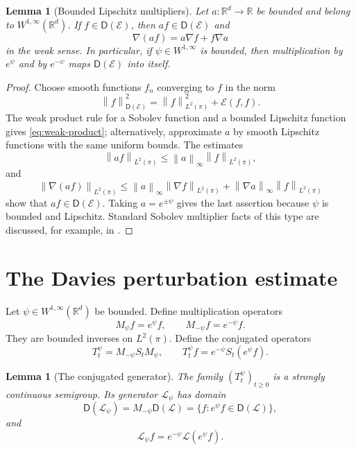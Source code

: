 \documentclass[11pt]{article}
\newtheorem{lemma}[theorem]{Lemma}
\newcommand{\R}{\mathbb R}
\newcommand{\cE}{\mathcal E}
\newcommand{\norm}[1]{\left\lVert #1\right\rVert}
\newcommand{\1}{\mathbf 1}
\newcommand{\D}{\mathsf D}
\begin{document}
\begin{lemma}[Bounded Lipschitz multipliers]\label{lem:multipliers}
Let \(a:\R^d\to\R\) be bounded and belong to \(W^{1,\infty}(\R^d)\).  If
\(f\in\D(\cE)\), then \(af\in\D(\cE)\) and
\begin{equation}\label{eq:weak-product}
 \nabla(af)=a\nabla f+f\nabla a
\end{equation}
in the weak sense.  In particular, if \(\psi\in W^{1,\infty}\) is bounded,
then multiplication by \(e^{\psi}\) and by \(e^{-\psi}\) maps
\(\D(\cE)\) into itself.
\end{lemma}

\begin{proof}
Choose smooth functions \(f_n\) converging to \(f\) in the norm
\[
 \norm f_{\D(\cE)}^2=\norm f_{L^2(\pi)}^2+\cE(f,f).
\]
The weak product rule for a Sobolev function and a bounded Lipschitz
function gives \eqref{eq:weak-product}; alternatively, approximate \(a\) by
smooth Lipschitz functions with the same uniform bounds.  The estimates
\[
 \norm{af}_{L^2(\pi)}\leq\norm a_\infty\norm f_{L^2(\pi)},
\]
and
\[
 \norm{\nabla(af)}_{L^2(\pi)}
 \leq
 \norm a_\infty\norm{\nabla f}_{L^2(\pi)}
 +\norm{\nabla a}_\infty\norm f_{L^2(\pi)}
\]
show that \(af\in\D(\cE)\).  Taking \(a=e^{\pm\psi}\) gives the last
assertion because \(\psi\) is bounded and Lipschitz.  Standard Sobolev
multiplier facts of this type are discussed, for example, in
\citet[Chapter~1]{Ouhabaz2005}.
\end{proof}

\section{The Davies perturbation estimate}\label{sec:davies}

Let \(\psi\in W^{1,\infty}(\R^d)\) be bounded.  Define multiplication
operators
\[
 M_{\psi}f=e^{\psi}f,
 \qquad
 M_{-\psi}f=e^{-\psi}f.
\]
They are bounded inverses on \(L^2(\pi)\).  Define the conjugated operators
\begin{equation}\label{eq:conjugated-semigroup}
 T_t^\psi=M_{-\psi}S_tM_\psi,
 \qquad
 T_t^\psi f=e^{-\psi}S_t(e^\psi f).
\end{equation}

\begin{lemma}[The conjugated generator]\label{lem:conjugated-generator}
The family \((T_t^\psi)_{t\geq0}\) is a strongly continuous semigroup.  Its
generator \(\mathcal L_\psi\) has domain
\begin{equation}\label{eq:conjugated-domain}
 \D(\mathcal L_\psi)
 =M_{-\psi}\D(\mathcal L)
 =\{f:e^\psi f\in\D(\mathcal L)\},
\end{equation}
and
\begin{equation}\label{eq:conjugated-generator}
 \mathcal L_\psi f=e^{-\psi}\mathcal L(e^\psi f).
\end{equation}
\end{lemma}
\end{document}
